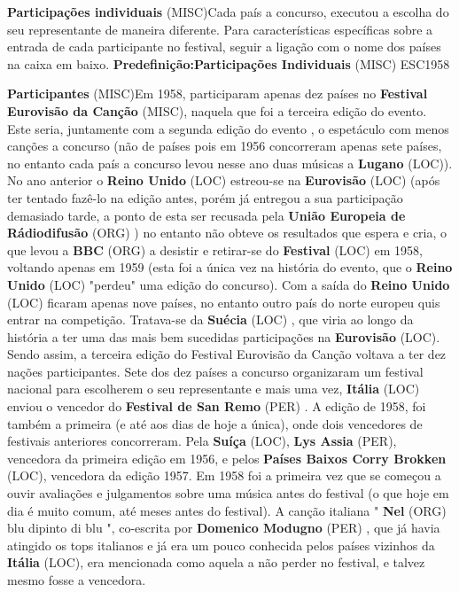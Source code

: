 \documentclass[12pt,a4paper]{article}
\begin{document}
\textbf{Participações individuais} (MISC)Cada país a concurso, executou a escolha do seu representante de maneira diferente. Para características específicas sobre a entrada de cada participante no festival, seguir a ligação com o nome dos países na caixa em baixo. \textbf{Predefinição:Participações Individuais} (MISC) ESC1958



\textbf{Participantes} (MISC)Em 1958, participaram apenas dez países no \textbf{Festival Eurovisão da Canção} (MISC), naquela que foi a terceira edição do evento. Este seria, juntamente com a segunda edição do evento , o espetáculo com menos canções a concurso (não de países pois em 1956 concorreram apenas sete países, no entanto cada país a concurso levou nesse ano duas músicas a \textbf{Lugano} (LOC)). No ano anterior o \textbf{Reino Unido} (LOC) estreou-se na \textbf{Eurovisão} (LOC) (após ter tentado fazê-lo na edição antes, porém já entregou a sua participação demasiado tarde, a ponto de esta ser recusada pela \textbf{União Europeia de Rádiodifusão} (ORG) ) no entanto não obteve os resultados que espera e cria, o que levou a \textbf{BBC} (ORG) a desistir e retirar-se do \textbf{Festival} (LOC) em 1958, voltando apenas em 1959 (esta foi a única vez na história do evento, que o \textbf{Reino Unido} (LOC) "perdeu" uma edição do concurso). Com a saída do \textbf{Reino Unido} (LOC) ficaram apenas nove países, no entanto outro país do norte europeu quis entrar na competição. Tratava-se da \textbf{Suécia} (LOC) , que viria ao longo da história a ter uma das mais bem sucedidas participações na \textbf{Eurovisão} (LOC). Sendo assim, a terceira edição do Festival Eurovisão da Canção voltava a ter dez nações participantes. Sete dos dez países a concurso organizaram um festival nacional para escolherem o seu representante e mais uma vez, \textbf{Itália} (LOC) enviou o vencedor do \textbf{Festival de San Remo} (PER) . A edição de 1958, foi também a primeira (e até aos dias de hoje a única), onde dois vencedores de festivais anteriores concorreram. Pela \textbf{Suíça} (LOC), \textbf{Lys Assia} (PER), vencedora da primeira edição em 1956, e pelos \textbf{Países Baixos Corry Brokken} (LOC), vencedora da edição 1957. Em 1958 foi a primeira vez que se começou a ouvir avaliações e julgamentos sobre uma música antes do festival (o que hoje em dia é muito comum, até meses antes do festival). A canção italiana " \textbf{Nel} (ORG) blu dipinto di blu ", co-escrita por \textbf{Domenico Modugno} (PER) , que já havia atingido os tops italianos e já era um pouco conhecida pelos países vizinhos da \textbf{Itália} (LOC), era mencionada como aquela a não perder no festival, e talvez mesmo fosse a vencedora.
\end{document}
